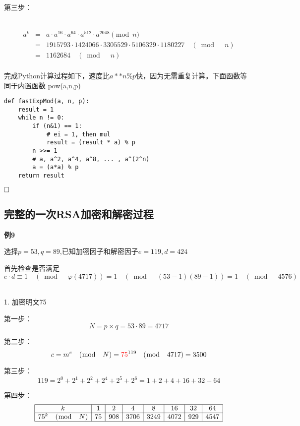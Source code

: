 \documentclass{article}
\begin{document}
~\\

第三步：

~\\

\begin{eqnarray}   
\label{eq}
a^{k} &=& a \cdot a^{16} \cdot a^{64} \cdot a^{512} \cdot a^{2048}  \pmod{n} \nonumber \\ 
 &=& 1915793 \cdot 1424066 \cdot 3305529 \cdot 5106329 \cdot 1180227 \quad (\bmod \quad n) \nonumber \\ 
 &=&  1162684 \quad (\bmod \quad n) \nonumber \\ 
\nonumber 
\end{eqnarray}

完成Python计算过程如下，速度比{\color{red}$a**n\%p$}快，因为无需重复计算。下面函数等同于内置函数 {\color{red}pow(a,n,p)}

\begin{lstlisting}
def fastExpMod(a, n, p):
    result = 1
    while n != 0:
        if (n&1) == 1:
            # ei = 1, then mul
            result = (result * a) % p
        n >>= 1
        # a, a^2, a^4, a^8, ... , a^(2^n)
        a = (a*a) % p
    return result
\end{lstlisting}



$\hfill\square$ 

\subsection{完整的一次RSA加密和解密过程}

\textbf{例9}

选择$p=53,q = 89$,已知加密因子和解密因子$e = 119,d = 424$

首先检查是否满足$e \cdot d \equiv 1 \quad (\bmod \quad \varphi(4717))= 1 \quad (\bmod \quad (53-1)(89-1))  = 1 \quad (\bmod \quad 4576) $

~\\

1. 加密明文{\color{red}75}

第一步：
$$N = p \times q = 53 \cdot 89 =4717$$

第二步：
$$c = m^e \quad (\bmod \quad N) = {\color{red}75}^{119} \quad (\bmod \quad 4717) = 3500$$

第三步：
$$119 = 2^0+2^1+2^2+2^4+2^5+2^6 = 1+2+4+16+32+64$$

第四步：
$$
\begin{array}{|c|c|c|c|c|c|c|c|}
\hline
k & 1 & 2 & 4 & 8 & 16 & 32 & 64 \\
\hline
75^k \quad (\bmod \quad N) & 75 &908&3706&3249&4072&929&4547\\
\hline
\end{array}
$$
\end{document}
